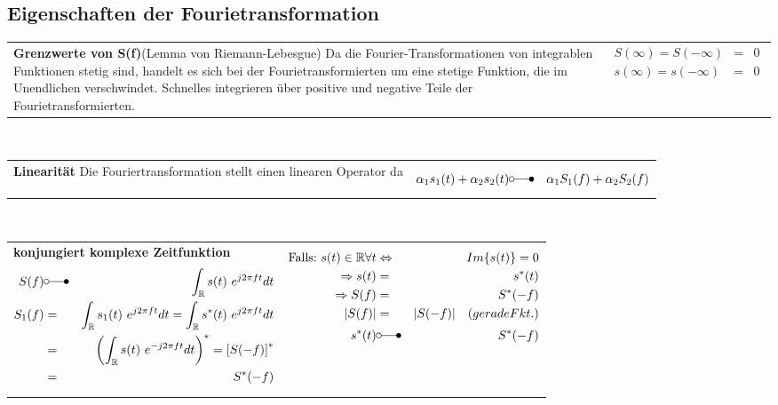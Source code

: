 \subsection{Eigenschaften der Fourietransformation}
\begin{tabular}{ll}
 \addtolength{\jot}{2mm}
 \parbox{8cm}{
  \centering
\textbf{Grenzwerte von S(f)}(Lemma von Riemann-Lebesgue)
\flushleft
Da die Fourier-Transformationen von integrablen Funktionen stetig sind, handelt es sich bei der Fourietransformierten um eine stetige Funktion, die im Unendlichen verschwindet. Schnelles integrieren über positive und negative Teile der Fourietransformierten.
}
 &
 \parbox{4cm}{
 \begin{eqnarray*}
S(\infty) = S(- \infty) &=& 0\\
s(\infty) = s(- \infty) &=& 0
 \end{eqnarray*}
}
\end{tabular}\\
\vspace{6pt}
\begin{tabular}{ll}
 \addtolength{\jot}{2mm}
 \parbox{7cm}{
  \centering
\textbf{Linearität}
\flushleft
Die Fouriertransformation stellt einen linearen Operator da
}
 &
 \parbox{5cm}{
 \begin{eqnarray*}
\alpha_1 s_1(t) + \alpha_2 s_2(t)  &\laplace& \alpha_1 S_1(f) + \alpha_2 S_2(f)
 \end{eqnarray*}
}
\end{tabular}\\
\vspace{6pt}
\begin{tabular}{ll}
 \addtolength{\jot}{2mm}
 \parbox{7cm}{
  \centering
\textbf{konjungiert komplexe Zeitfunktion}
 \begin{eqnarray*}
S(f) &\laplace& \int_\mathbb{R}s(t)~e^{j2 \pi ft}dt\\
S_1(f) &=& \int_\mathbb{R}s_1(t)~e^{j2 \pi ft}dt = \int_\mathbb{R}s^*(t)~e^{j2 \pi ft}dt\\
&=& \left( \int_\mathbb{R}s(t)~e^{-j2 \pi ft}dt\right)^* = \left[ S(-f)\right]^*\\
&=& S^*(-f)
 \end{eqnarray*}
}
 &
 \parbox{5cm}{
 \begin{eqnarray*}
\text{Falls:}~ s(t) \in \mathbb{R} \forall t &\Leftrightarrow& Im\lbrace s(t)\rbrace =0\\
\Rightarrow s(t) &=& s^*(t)\\
\Rightarrow S(f) &=& S^*(-f)  \\
\vert S(f) \vert &=& \vert S(-f) \vert \quad(gerade Fkt.)\\
 s^*(t) &\laplace& S^*(-f)
 \end{eqnarray*}
}
\end{tabular}\\
